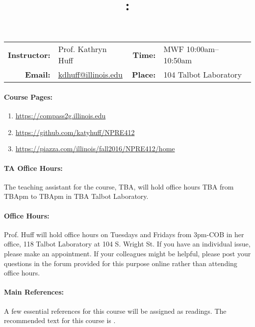 \documentclass[11pt, a4paper]{article}
\title{\CourseNumber: \CourseTitle\\}
\author{\CourseUniversity}
\date{\CourseSemester \CourseYear}
\makeatletter
\newcommand{\CourseNumber}{NPRE412}
\newcommand{\CourseInstructor}{Prof. Kathryn Huff\xspace}%
\newcommand{\CourseDays}{MWF\xspace}%
\newcommand{\CourseStart}{10:00am\xspace}%
\newcommand{\CourseEnd}{10:50am\xspace}%
\newcommand{\CourseInstructorEmail}{kdhuff@illinois.edu}
\newcommand{\CourseRoom}{104\xspace}%
\newcommand{\CourseBuilding}{Talbot Laboratory\xspace}%
\newcommand{\TeachingAssistant}{TBA\xspace}%
\newcommand{\TAOfficeHourDays}{TBA\xspace}%
\newcommand{\TAOfficeHourStart}{TBApm\xspace}%
\newcommand{\TAOfficeHourEnd}{TBApm\xspace}%
\newcommand{\TAOfficeHourPlace}{TBA Talbot Laboratory\xspace}
\makeatother
\begin{document}
\maketitle
\renewcommand{\arraystretch}{1.5}
\begin{center}
\begin{table}[h]
\begin{tabularx}{\textwidth}{rXrX}
\hline
\textbf{Instructor:} & \CourseInstructor & \textbf{Time:} & \CourseDays \CourseStart -- \CourseEnd \\
\textbf{Email:} &  \href{mailto:\CourseInstructorEmail}{\CourseInstructorEmail} & \textbf{Place:} & \CourseRoom \CourseBuilding\\
\end{tabularx}
\end{table}
\end{center}

\paragraph{Course Pages:}
\begin{enumerate}
        \item \url{https://compass2g.illinois.edu}
        \item \url{https://github.com/katyhuff/\CourseNumber}
        \item \url{https://piazza.com/illinois/fall2016/\CourseNumber/home}
\end{enumerate}

\paragraph{TA Office Hours:} The teaching assistant for the course, 
\TeachingAssistant, will hold office hours \TAOfficeHourDays from 
\TAOfficeHourStart to \TAOfficeHourEnd in \TAOfficeHourPlace.

\paragraph{Office Hours:} Prof. Huff will hold office hours on Tuesdays and 
Fridays from 3pm-COB in her office, 118 Talbot Laboratory at 104 S. Wright St. 
If you have an individual issue, please make an appointment. If your colleagues 
might be helpful, please post your questions in the forum provided for this 
purpose online rather than attending office hours.

\paragraph{Main References:}
A few essential references for this course will be assigned as readings. The 
recommended text for this course is \cite{tsoulfanidis_nuclear_2013}.

\renewcommand{\refname}{\normalfont\selectfont\normalsize}\vspace{-1cm} 

\end{document}
